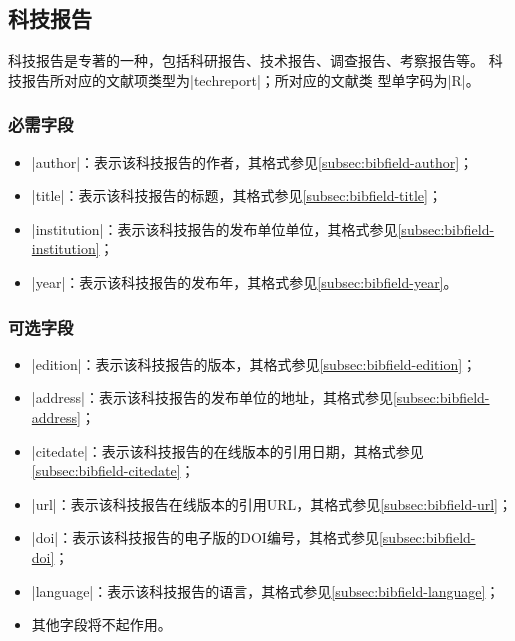 
\subsection{科技报告}\label{subsec:bibtype-techreport}

科技报告是专著的一种，包括科研报告、技术报告、调查报告、考察报告等\cite{gbt3469-1983}。
科技报告所对应的{\BibTeX}文献项类型为|techreport|；所对应的文献类
型单字码为|R|\cite{gbt3469-1983}。

\subsubsection{必需字段}

\begin{itemize}
\item |author|：表示该科技报告的作者，其格式参见\ref{subsec:bibfield-author}；
\item |title|：表示该科技报告的标题，其格式参见\ref{subsec:bibfield-title}；
\item |institution|：表示该科技报告的发布单位单位，其格式参见\ref{subsec:bibfield-institution}；
\item |year|：表示该科技报告的发布年，其格式参见\ref{subsec:bibfield-year}。
\end{itemize}

\subsubsection{可选字段}

\begin{itemize}
\item |edition|：表示该科技报告的版本，其格式参见\ref{subsec:bibfield-edition}；
\item |address|：表示该科技报告的发布单位的地址，其格式参见\ref{subsec:bibfield-address}；
\item |citedate|：表示该科技报告的在线版本的引用日期，其格式参见\ref{subsec:bibfield-citedate}；
\item |url|：表示该科技报告在线版本的引用URL，其格式参见\ref{subsec:bibfield-url}；
\item |doi|：表示该科技报告的电子版的DOI编号，其格式参见\ref{subsec:bibfield-doi}；
\item |language|：表示该科技报告的语言，其格式参见\ref{subsec:bibfield-language}；
\item 其他字段将不起作用。
\end{itemize}


